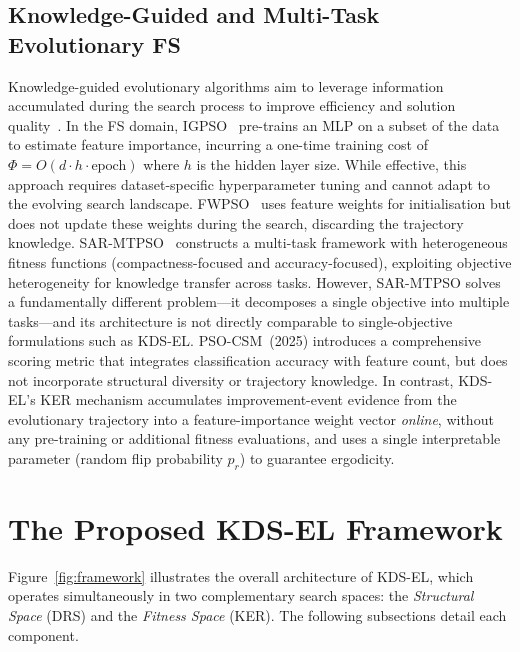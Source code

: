 \documentclass[a4paper,fleqn]{cas-dc}
\begin{document}
\begin{sloppypar}
	\subsection{Knowledge-Guided and Multi-Task Evolutionary FS}
	\label{sec:related:knowledge}

	\par{
	Knowledge-guided evolutionary algorithms aim to leverage information
	accumulated during the search process to improve efficiency and
	solution quality~\citep{jin2011surrogate}.
	In the FS domain, IGPSO~\citep{IGPSO_CITE} pre-trains an MLP on
	a subset of the data to estimate feature importance, incurring a
	one-time training cost of $\Phi = O(d \cdot h \cdot \text{epoch})$
	where $h$ is the hidden layer size.
	While effective, this approach requires dataset-specific
	hyperparameter tuning and cannot adapt to the evolving search
	landscape.
	FWPSO~\citep{huang2020enhanced} uses feature weights for
	initialisation but does not update these weights during the search,
	discarding the trajectory knowledge.
	SAR-MTPSO~\citep{SARMTPSO_CITE} constructs a multi-task framework
	with heterogeneous fitness functions (compactness-focused and
	accuracy-focused), exploiting objective heterogeneity for knowledge
	transfer across tasks.
	However, SAR-MTPSO solves a fundamentally different problem---it
	decomposes a single objective into multiple tasks---and its
	architecture is not directly comparable to single-objective
	formulations such as KDS-EL.
	PSO-CSM~(2025) introduces a comprehensive scoring metric that
	integrates classification accuracy with feature count, but does
	not incorporate structural diversity or trajectory knowledge.
	In contrast, KDS-EL's KER mechanism accumulates improvement-event
	evidence from the evolutionary trajectory into a feature-importance
	weight vector \emph{online}, without any pre-training or additional
	fitness evaluations, and uses a single interpretable parameter
	(random flip probability $p_r$) to guarantee ergodicity.
	}


	\section{The Proposed KDS-EL Framework}
	\label{sec:method}

	Figure~\ref{fig:framework} illustrates the overall architecture of
	KDS-EL, which operates simultaneously in two complementary search
	spaces: the \emph{Structural Space} (DRS) and the \emph{Fitness
	Space} (KER). The following subsections detail each component.


\end{sloppypar}
\end{document}
